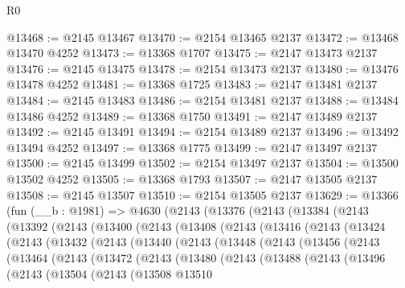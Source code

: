 \begin{lexlean}{R0}
\begin{coremodule}
@13468 := @2145 @13467
@13470 := @2154 @13465 @2137
@13472 := @13468 @13470 @4252
@13473 := @13368 @1707
@13475 := @2147 @13473 @2137
@13476 := @2145 @13475
@13478 := @2154 @13473 @2137
@13480 := @13476 @13478 @4252
@13481 := @13368 @1725
@13483 := @2147 @13481 @2137
@13484 := @2145 @13483
@13486 := @2154 @13481 @2137
@13488 := @13484 @13486 @4252
@13489 := @13368 @1750
@13491 := @2147 @13489 @2137
@13492 := @2145 @13491
@13494 := @2154 @13489 @2137
@13496 := @13492 @13494 @4252
@13497 := @13368 @1775
@13499 := @2147 @13497 @2137
@13500 := @2145 @13499
@13502 := @2154 @13497 @2137
@13504 := @13500 @13502 @4252
@13505 := @13368 @1793
@13507 := @2147 @13505 @2137
@13508 := @2145 @13507
@13510 := @2154 @13505 @2137
@13629 := @13366
    (fun (__b : @1981) =>
    @4630
      (@2143
        (@13376
          (@2143
            (@13384
              (@2143
                (@13392
                  (@2143
                    (@13400
                      (@2143
                        (@13408
                          (@2143
                            (@13416
                              (@2143
                                (@13424
                                  (@2143
                                    (@13432
                                      (@2143
                                        (@13440
                                          (@2143
                                            (@13448
                                              (@2143
                                                (@13456
                                                  (@2143
                                                    (@13464
                                                      (@2143
                                                        (@13472
                                                          (@2143
                                                            (@13480
                                                              (@2143
                                                                (@13488
                                                                  (@2143
                                                                    (@13496
                                                                      (@2143
                                                                        (@13504
                                                                          (@2143
                                                                            (@13508
                                                                              @13510

\end{coremodule}
\end{lexlean}

